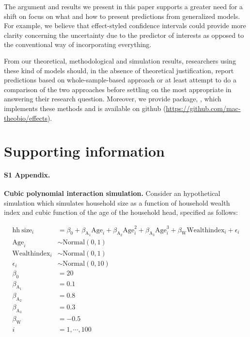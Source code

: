 The argument and results we present in this paper supports a greater need for a shift on focus on what and how to present predictions from generalized models. For example, we believe that effect-styled confidence intervals could provide more clarity concerning the uncertainty due to the predictor of interests as opposed to the conventional way of incorporating everything. 

From our theoretical, methodological and simulation results, researchers using these kind of models should, in the absence of theoretical justification, report predictions based on whole-sample-based approach or at least attempt to do a comparison of the two approaches before settling on the most appropriate in answering their research question. Moreover, we provide  package, , which implements these methods and is available on github (\href{https://github.com/mac-theobio/effects}{https://github.com/mac-theobio/effects}).


\section{Supporting information}

\paragraph*{S1 Appendix.}
\label{S1_Appendix}
{\bf Cubic polynomial interaction simulation.} Consider an hypothetical simulation which simulates household size as a function of household wealth index and cubic function of the age of the household head, specified as follows:

\begin{align}\label{sim:lm_cubic}
\mathrm{hh~size}_i &= \beta_0 + \beta_{\mathrm{A_1}}\mathrm{Age}_i + \beta_{\mathrm{A_2}}\mathrm{Age}^2_i + \beta_{\mathrm{A_3}}\mathrm{Age}^3_i + \beta_{\mathrm{W}}\mathrm{Wealthindex}_i + \epsilon_i \nonumber\\
\mathrm{Age}_i &\sim \mathrm{Normal}(0, 1) \nonumber\\
\mathrm{Wealthindex}_i &\sim \mathrm{Normal}(0, 1) \nonumber\\
\epsilon_i &\sim \mathrm{Normal}(0, 10) \nonumber\\
\beta_0 &= 20 \nonumber\\
\beta_{\mathrm{A}_1} &= 0.1 \nonumber\\
\beta_{\mathrm{A}_2} &= 0.8 \nonumber\\
\beta_{\mathrm{A}_3} &= 0.3 \nonumber\\
\beta_{\mathrm{W}} &= -0.5 \nonumber\\
i &= 1,\cdots, 100
\end{align}


